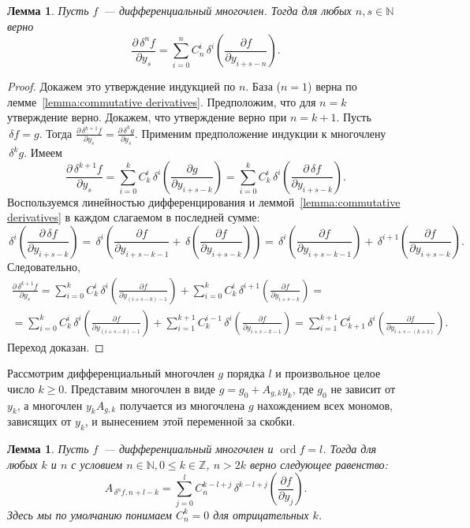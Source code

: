 \documentclass[11pt]{article}
\DeclareMathOperator{\ord}{ord}
\renewcommand{\le}{\leqslant}
\renewcommand{\ge}{\geqslant}
\theoremstyle{plain1}
\newtheorem{lemma}[theorem1]{Лемма}
\theoremstyle{plain2}
\theoremstyle{plain}
\theoremstyle{plain3}
\theoremstyle{definition}
\theoremstyle{remark}
\begin{document}
\begin{lemma}\label{lemma:f^(n)}
Пусть $f$~--- дифференциальный многочлен. Тогда для любых $n, s \in\mathbb{N}$ верно
$$
\frac{\partial \,\delta^n f}{\partial y_s} = \sum\limits_{i=0}^n  C_n^i  \,\delta^i \left(\frac{\partial f}{\partial y_{i+s-n}}\right).
$$
\end{lemma}
\begin{proof}
Докажем это утверждение индукцией по $n$.  База ($n=1$) верна по лемме~\ref{lemma:commutative derivatives}. Предположим, что для $n=k$ утверждение верно.
Докажем, что утверждение верно при $n=k+1$. Пусть $\,\delta f=g$. Тогда
$\frac{\partial \,\delta^{k+1} f}{\partial y_s} = \frac{\partial \,\delta^k g}{\partial y_s}$.
Применим предположение индукции к многочлену $\,\delta^k g$. Имеем 
$$
\frac{\partial \,\delta^{k+1} f}{\partial y_s} =  \sum\limits_{i=0}^k  C_k^i  \,\delta^i \left(\frac{\partial g}{\partial y_{i+s-k}}\right)=\sum\limits_{i=0}^k  C_k^i  \,\delta^i \left(\frac{\partial \,\delta f}{\partial y_{i+s-k}}\right). 
$$
Воспользуемся линейностью дифференцирования и леммой~\ref{lemma:commutative derivatives} в каждом слагаемом в последней сумме:  
$$
\,\delta^i \left(\frac{\partial \,\delta f}{\partial y_{i+s-k}}\right)=\,\delta^i\left(\frac{\partial f}{\partial y_{i+s-k-1}}+\,\delta\left(\frac{\partial f}{\partial y_{i+s-k}}\right)\right)=\,\delta^i\left(\frac{\partial f}{\partial y_{i+s-k-1}}\right)+\,\delta^{i+1}\left(\frac{\partial f}{\partial y_{i+s-k}}\right).
$$ 
Следовательно,
\begin{gather*}
\frac{\partial \,\delta^{k+1} f}{\partial y_s}=\sum\limits_{i=0}^k  C_k^i \,\delta^i \left(\frac{\partial f}{\partial y_{(i+s-k)-1}}\right)+\sum\limits_{i=0}^k  C_k^i \,\delta^{i+1} \left(\frac{\partial f}{\partial y_{i+s-k}}\right) = \\
= \sum\limits_{i=0}^k  C_k^i \,\delta^i \left(\frac{\partial f}{\partial y_{(i+s-k)-1}}\right)+\sum\limits_{i=1}^{k+1}  C_k^{i-1}\,\delta^i \left(\frac{\partial f}{\partial y_{i+s-k-1}}\right)=\sum\limits_{i=1}^{k+1} C_{k+1}^{i}\,\delta^i\left(\frac{\partial f}{\partial y_{i+s-(k+1)}}\right).
\end{gather*}
Переход доказан.
\end{proof}
Рассмотрим дифференциальный многочлен $g$ порядка $l$ и произвольное
целое число $k\ge0$. Представим многочлен в виде $g=g_0+A_{g,k}y_k$, где
$g_0$ не зависит от $y_k$, а многочлен $y_kA_{g,k}$ получается из
многочлена $g$ нахождением всех мономов, зависящих от $y_k$, и
вынесением этой переменной за скобки.
\begin{lemma}\label{lemma:A_fn}
Пусть $f$~--- дифференциальный многочлен и $\ord f = l$.
Тогда для любых $k$ и $n$ с условием  $n\in\mathbb{N},0\le k\in\mathbb{Z}$, $n>2k$ верно следующее
равенство:
$$
A_{\,\delta^n f, n+l-k}=\sum\limits_{j=0}^{l}C_n^{k - l + j
}\,\delta^{k-l+j}\left(\frac{\partial f}{\partial y_j}\right).
$$
Здесь мы по умолчанию понимаем $C_n^{k}=0$ для отрицательных
$k$.
\end{lemma}
\end{document}
